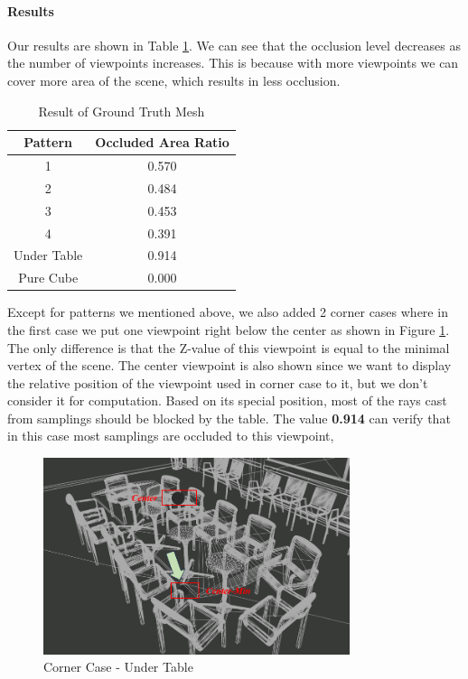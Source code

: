 \documentclass[11pt, a4paper,oneside,chapterprefix=false]{scrbook}
\begin{document}
\paragraph{Results}

Our results are shown in Table \ref{tab:result of each experiment}. We can see that the occlusion level decreases as the number of viewpoints increases. This is because with more viewpoints we can cover more area of the scene, which results in less occlusion.

\vspace{10pt}

\begin{table}[h]
    \centering
    \begin{tabular}{|c|c|}
        \hline
        \textbf{Pattern} & \textbf{Occluded Area Ratio} \\
        \hline
        1 & 0.570 \\
        2 & 0.484 \\
		3 & 0.453 \\
		4 & 0.391 \\
        Under Table & 0.914 \\
        Pure Cube & 0.000 \\

        \hline
    \end{tabular}
    \caption{Result of Ground Truth Mesh}
    \label{tab:result of each experiment}
\end{table}

\vspace{10pt}

Except for patterns we mentioned above, we also added 2 corner cases where in the first case we put one viewpoint right below the center as shown in Figure \ref{fig:corner case under table}. The only difference is that the Z-value of this viewpoint is equal to the minimal vertex of the scene. The center viewpoint is also shown since we want to display the relative position of the viewpoint used in corner case to it, but we don't consider it for computation. Based on its special position, most of the rays cast from samplings should be blocked by the table. The value \textbf{0.914} can verify that in this case most samplings are occluded to this viewpoint, 

\begin{figure}[H]
    \centering
    \includegraphics*[width=0.8\textwidth]{figures/edge case-under table.png}
    \caption{Corner Case - Under Table}
    \label{fig:corner case under table}
\end{figure}
\end{document}
